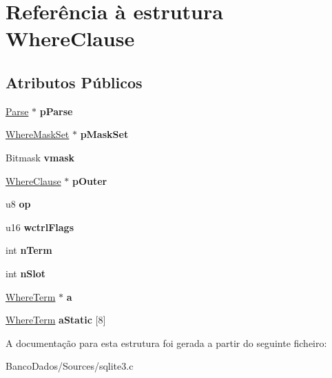 \hypertarget{struct_where_clause}{\section{Referência à estrutura Where\-Clause}
\label{struct_where_clause}
}
\subsection*{Atributos Públicos}
\begin{DoxyCompactItemize}
\item 
\hypertarget{struct_where_clause_a3ff6dfc93e7b9b97a9bf9a0618a1d542}{\hyperlink{struct_parse}{Parse} $\ast$ {\bfseries p\-Parse}}\label{struct_where_clause_a3ff6dfc93e7b9b97a9bf9a0618a1d542}

\item 
\hypertarget{struct_where_clause_ae308a1600721b7dfa0855136926a5554}{\hyperlink{struct_where_mask_set}{Where\-Mask\-Set} $\ast$ {\bfseries p\-Mask\-Set}}\label{struct_where_clause_ae308a1600721b7dfa0855136926a5554}

\item 
\hypertarget{struct_where_clause_aaef3dd42bb6c23890d8ad8824e2a00ee}{Bitmask {\bfseries vmask}}\label{struct_where_clause_aaef3dd42bb6c23890d8ad8824e2a00ee}

\item 
\hypertarget{struct_where_clause_a6f72d61f416a323f39a8d3e2be62f607}{\hyperlink{struct_where_clause}{Where\-Clause} $\ast$ {\bfseries p\-Outer}}\label{struct_where_clause_a6f72d61f416a323f39a8d3e2be62f607}

\item 
\hypertarget{struct_where_clause_a7a56a5fe1ab6603e930f3b5372ff2f71}{u8 {\bfseries op}}\label{struct_where_clause_a7a56a5fe1ab6603e930f3b5372ff2f71}

\item 
\hypertarget{struct_where_clause_a65f8d6f982be80ca3336483ddb8a2f3e}{u16 {\bfseries wctrl\-Flags}}\label{struct_where_clause_a65f8d6f982be80ca3336483ddb8a2f3e}

\item 
\hypertarget{struct_where_clause_ab84924c3c78af1ab387ab3919c5031c4}{int {\bfseries n\-Term}}\label{struct_where_clause_ab84924c3c78af1ab387ab3919c5031c4}

\item 
\hypertarget{struct_where_clause_ac92b93d65d4c3d9216707a049a4edb1c}{int {\bfseries n\-Slot}}\label{struct_where_clause_ac92b93d65d4c3d9216707a049a4edb1c}

\item 
\hypertarget{struct_where_clause_a140d726a3e20ac7b6853d539c59add72}{\hyperlink{struct_where_term}{Where\-Term} $\ast$ {\bfseries a}}\label{struct_where_clause_a140d726a3e20ac7b6853d539c59add72}

\item 
\hypertarget{struct_where_clause_a4acb8640bc9f42752900de5735bcd8e0}{\hyperlink{struct_where_term}{Where\-Term} {\bfseries a\-Static} \mbox{[}8\mbox{]}}\label{struct_where_clause_a4acb8640bc9f42752900de5735bcd8e0}

\end{DoxyCompactItemize}


A documentação para esta estrutura foi gerada a partir do seguinte ficheiro\-:\begin{DoxyCompactItemize}
\item 
Banco\-Dados/\-Sources/sqlite3.\-c\end{DoxyCompactItemize}
